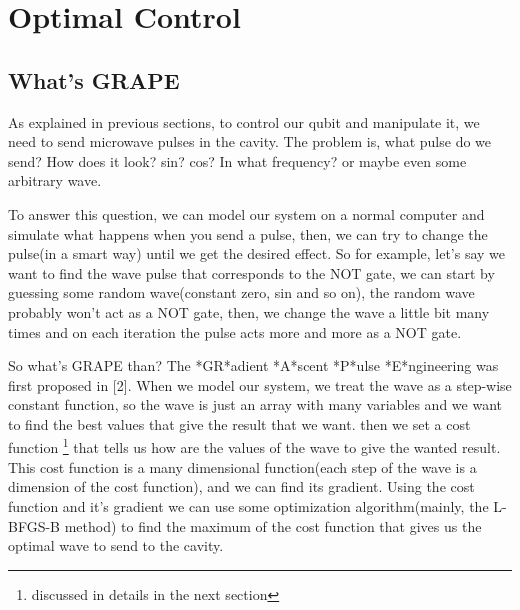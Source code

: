 \documentclass{article}
\begin{document}
\newpage
\section{Optimal Control}

\subsection{What's GRAPE} %
As explained in previous sections, to control our qubit and manipulate it, we need to send microwave pulses in the cavity. The problem is, what pulse do we send? How does it look? sin? cos? In what frequency? or maybe even some arbitrary wave. \par
To answer this question, we can model our system on a normal computer and simulate what happens when you send a pulse, then, we can try to change the pulse(in a smart way) until we get the desired effect. So for example, let's say we want to find the wave pulse that corresponds to the NOT gate, we can start by guessing some random wave(constant zero, sin and so on), the random wave probably won't act as a NOT gate, then, we change the wave a little bit many times and on each iteration the pulse acts more and more as a NOT gate.\par
So what's GRAPE than? The *GR*adient *A*scent *P*ulse *E*ngineering was first proposed in [2]. When we model our system, we treat the wave as a step-wise constant function, so the wave is just an array with many variables and we want to find the best values that give the result that we want. then we set a cost function \footnote{discussed in details in the next section} that tells us how are the values of the wave to give the wanted result. This cost function is a many dimensional function(each step of the wave is a dimension of the cost function), and we can find its gradient. Using the cost function and it's gradient we can use some optimization algorithm(mainly, the L-BFGS-B method) to find the maximum of the cost function that gives us the optimal wave to send to the cavity.
\end{document}
